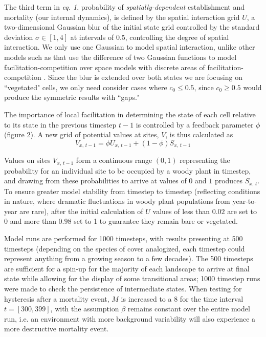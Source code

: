 \documentclass[10pt]{article}
\begin{document}
\begin{linenumbers}
The third term in \textit{eq. 1}, probability of \textit{spatially-dependent} establishment and mortality (our internal dynamics), is defined by the spatial interaction grid $U$, a two-dimensional Gaussian blur of the initial state grid controlled by the standard deviation $\sigma \in [1,4]$ at intervals of 0.5, controlling the degree of spatial interaction. We only use one Gaussian to model spatial interaction, unlike other models such as \citet{DOdorico2006} that use the difference of two Gaussian functions to model facilitation-competition over space models with discrete areas of facilitation-competition \citealt{Rietkerk2004}. Since the blur is extended over both states we are focusing on ``vegetated" cells, we only need consider cases where $c_0 \le 0.5$, since $c_0 \ge 0.5$ would produce the symmetric results with ``gaps."

The importance of local facilitation in determining the state of each cell relative to its state in the previous timestep $t-1$ is controlled by a feedback parameter $\phi$ (figure 2). A new grid of potential values at sites, $V$, is thus calculated as
\begin{equation}V_{x,\,t-1} = \phi U_{x,\,t-1} + (1- \phi) S_{x,\,t-1}\end{equation}

Values on sites $V_{x,\,t-1}$ form a continuous range $(0,1)$ representing the probability for an individual site to be occupied by a woody plant in timestep, and drawing from these probabilities to arrive at values of $0$ and $1$ produces $S_{x,\,t}$. To ensure greater model stability from timestep to timestep (reflecting conditions in nature, where dramatic fluctuations in woody plant populations from year-to-year are rare), after the initial calculation of $U$  values of less than $0.02$ are set to $0$ and more than $0.98$ set to 1 to guarantee they remain bare or vegetated.  

Model runs are performed for 1000 timesteps, with results presenting at 500 timesteps (depending on the species of cover analogized, each timestep could represent anything from a growing season to a few decades).  The 500 timesteps are sufficient for a spin-up for the majority of each landscape to arrive at final state while allowing for the display of some transitional areas; 1000 timestep runs were made to check the persistence of intermediate states. When testing for hysteresis after a mortality event, $M$ is increased to a 8 for the time interval $t=[300,399]$, with the assumption $\beta$ remains constant over the entire model run, i.e. an environment with more background variability will also experience a more destructive mortality event.


\end{linenumbers}
\end{document}
